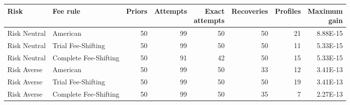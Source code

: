 \documentclass[10pt,border=5pt]{standalone}
\begin{document}
\begin{tabular}{llrrrrrr}
\toprule Risk & Fee rule & Priors & Attempts & \shortstack{Exact\\attempts} & Recoveries & Profiles & \shortstack{Maximum\\gain} \\
\midrule
Risk Neutral & American & 50 & 99 & 50 & 50 & 21 & 8.88E-15 \\
Risk Neutral & Trial Fee-Shifting & 50 & 99 & 50 & 50 & 11 & 5.33E-15 \\
Risk Neutral & Complete Fee-Shifting & 50 & 91 & 42 & 50 & 15 & 5.33E-15 \\
Risk Averse & American & 50 & 99 & 50 & 33 & 12 & 3.41E-13 \\
Risk Averse & Trial Fee-Shifting & 50 & 99 & 50 & 50 & 19 & 3.41E-13 \\
Risk Averse & Complete Fee-Shifting & 50 & 99 & 50 & 35 & 7 & 2.27E-13 \\
\bottomrule\end{tabular}
\end{document}
